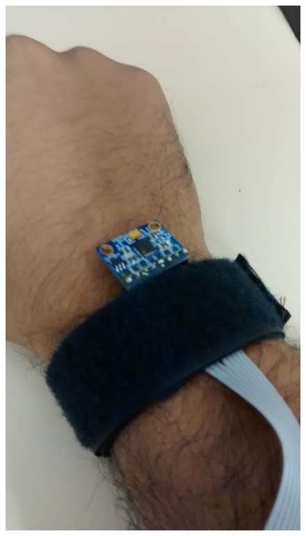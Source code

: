 	 	\begin{figure}[h]
	 		\centering
	 		\includegraphics[keepaspectratio=true,scale=0.1]{figuras/prototipo_2_2.jpg}

\end{figure}
